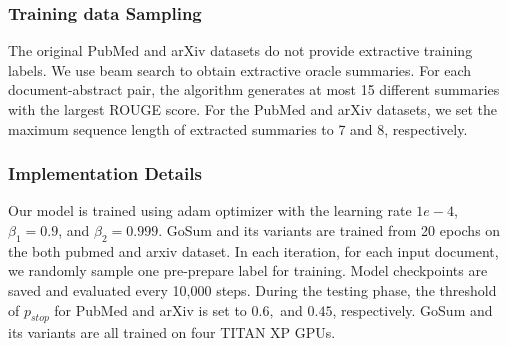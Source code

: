 \documentclass[11pt,a4paper]{article}
\begin{document}
\subsubsection{Training data Sampling}
The original PubMed and arXiv datasets do not provide extractive training labels.
We use beam search to obtain extractive oracle summaries. For each document-abstract pair, the algorithm generates at most 15 different summaries with the largest ROUGE score. For the PubMed and arXiv datasets, we set the maximum sequence length of extracted summaries to 7 and 8, respectively.

\subsubsection{Implementation Details}
Our model is trained using adam\cite{adam_2015} optimizer with the learning rate $1e-4$, $\beta_1 = 0.9$, and $\beta_2=0.999$.
GoSum and its variants are trained from 20 epochs on the both pubmed and arxiv dataset.
In each iteration, for each input document, we randomly sample one pre-prepare label for training.
Model checkpoints are saved and evaluated every 10,000 steps.
During the testing phase, the threshold of $p_{stop}$ for PubMed and arXiv is set to $0.6,$ and $ 0.45$, respectively.
GoSum and its variants are all trained on four TITAN XP GPUs.
\end{document}
